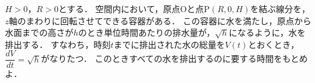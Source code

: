 \documentclass[../../main.tex]{subfiles}
\begin{document}
$H>0$，$R>0$とする．
空間内において，原点$\mathrm{O}$と点$\mathrm{P}(R,0,H)$を結ぶ線分を，$z$軸のまわりに回転させてできる容器がある．
この容器に水を満たし，原点から水面までの高さが$h$のとき単位時間あたりの排水量が，$\sqrt{h}$になるように，水を排出する．
すなわち，時刻$t$までに排出された水の総量を$V(t)$とおくとき，$\dfrac{dV}{dt}=\sqrt{h}$がなりたつ．
このときすべての水を排出するのに要する時間をもとめよ．
\end{document}
